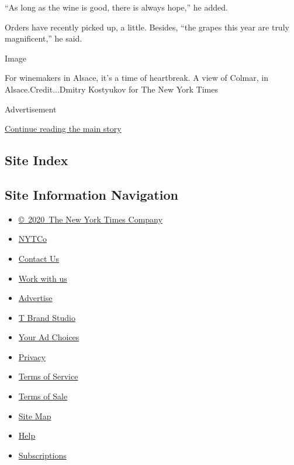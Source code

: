 ``As long as the wine is good, there is always hope,'' he added.

Orders have recently picked up, a little. Besides, ``the grapes this
year are truly magnificent,'' he said.

Image

For winemakers in Alsace, it's a time of heartbreak. A view of Colmar,
in Alsace.Credit...Dmitry Kostyukov for The New York Times

Advertisement

\protect\hyperlink{after-bottom}{Continue reading the main story}

\hypertarget{site-index}{%
\subsection{Site Index}\label{site-index}}

\hypertarget{site-information-navigation}{%
\subsection{Site Information
Navigation}\label{site-information-navigation}}

\begin{itemize}
\tightlist
\item
  \href{https://help.nytimes.com/hc/en-us/articles/115014792127-Copyright-notice}{©~2020~The
  New York Times Company}
\end{itemize}

\begin{itemize}
\tightlist
\item
  \href{https://www.nytco.com/}{NYTCo}
\item
  \href{https://help.nytimes.com/hc/en-us/articles/115015385887-Contact-Us}{Contact
  Us}
\item
  \href{https://www.nytco.com/careers/}{Work with us}
\item
  \href{https://nytmediakit.com/}{Advertise}
\item
  \href{http://www.tbrandstudio.com/}{T Brand Studio}
\item
  \href{https://www.nytimes.com/privacy/cookie-policy\#how-do-i-manage-trackers}{Your
  Ad Choices}
\item
  \href{https://www.nytimes.com/privacy}{Privacy}
\item
  \href{https://help.nytimes.com/hc/en-us/articles/115014893428-Terms-of-service}{Terms
  of Service}
\item
  \href{https://help.nytimes.com/hc/en-us/articles/115014893968-Terms-of-sale}{Terms
  of Sale}
\item
  \href{https://spiderbites.nytimes.com}{Site Map}
\item
  \href{https://help.nytimes.com/hc/en-us}{Help}
\item
  \href{https://www.nytimes.com/subscription?campaignId=37WXW}{Subscriptions}
\end{itemize}

